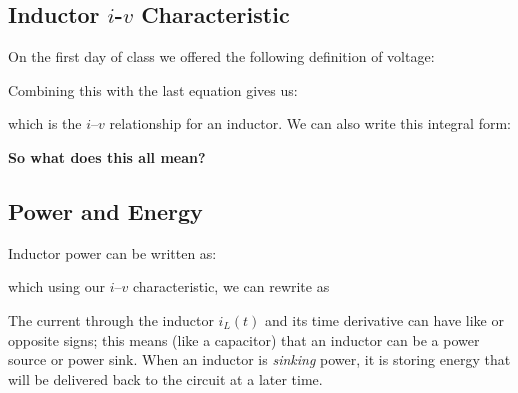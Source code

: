 \documentclass{handout}
\begin{document}
\newpage
\clearpage
\pagebreak


\subsection{Inductor $i$-$v$ Characteristic}
On the first day of class we offered the following definition of voltage:

Combining this with the last equation gives us:

which is the $i$--$v$ relationship for an inductor. We can also write this integral form:

\textbf{So what does this all mean?}


\newpage
\clearpage
\pagebreak

\subsection{Power and Energy}
Inductor power can be written as:

which using our $i$--$v$ characteristic, we can rewrite as


The current through the inductor $i_L(t)$ and its time derivative can have like or opposite signs; this means (like a capacitor) that an inductor can be a power source or power sink.  When an inductor is {\em sinking} power, it is storing energy that will be delivered back to the circuit at a later time.
\end{document}
